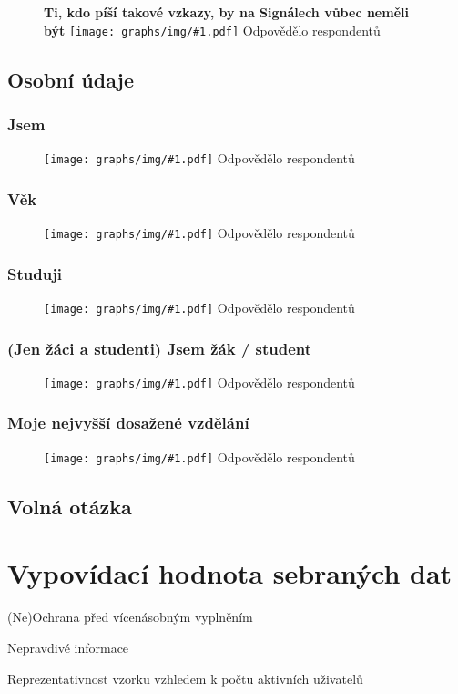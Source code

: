 \documentclass[12pt, a4paper, twoside]{article}
\newcommand{\answercount}[1]{Odpovědělo  respondentů}
\newcommand{\includegraph}[2]{
  \begin{figure}[H]
    \centering
    \textbf{#2}
    \texttt{[image: graphs/img/\#1.pdf]}
    \answercount{#1}
  \end{figure}
}
\begin{document}
\includegraph{neprijemne_vzkazy_pisatele_pryc}{Ti, kdo píší takové vzkazy, by na Signálech vůbec neměli být}

\subsection{Osobní údaje}\label{sec:osobni}

\subsubsection{Jsem}

\includegraph{jsem}{}

\subsubsection{Věk}

\includegraph{vek}{}

\subsubsection{Studuji}

\includegraph{studuji}{}

\subsubsection{(Jen žáci a studenti) Jsem žák / student}

\includegraph{studuji_co}{}

\subsubsection{Moje nejvyšší dosažené vzdělání}

\includegraph{moje_nejvyssi_dosazene_vzdelani}{}

\subsection{Volná otázka }

\section{Vypovídací hodnota sebraných dat}

(Ne)Ochrana před vícenásobným vyplněním

Nepravdivé informace

Reprezentativnost vzorku vzhledem k počtu aktivních uživatelů
\end{document}
